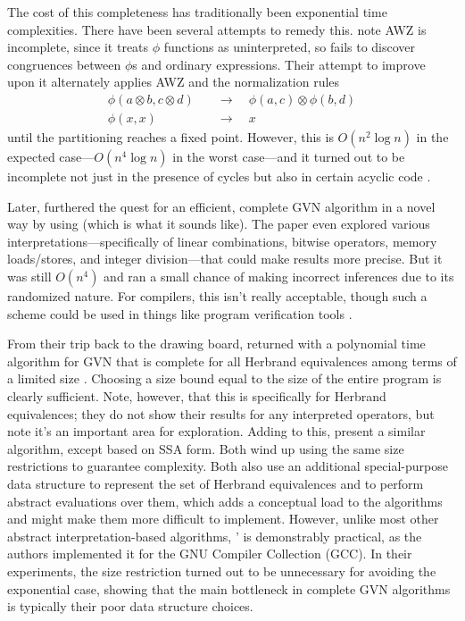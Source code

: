 The cost of this completeness has traditionally been exponential time
complexities.  There have been several attempts to remedy this.
 \autocite*{RKS} note AWZ is incomplete, since it treats $\phi$
functions as uninterpreted, so fails to discover congruences between $\phi$s
and ordinary expressions.  Their attempt to improve upon it alternately applies
AWZ and the normalization rules
\begin{align*}
  \phi(a\otimes b, c\otimes d) &\quad\to\quad \phi(a,c) \otimes \phi(b,d) \\
  \phi(x, x) &\quad\to\quad x
\end{align*}
until the partitioning reaches a fixed point.  However, this is $O(n^2 \log n)$
in the expected case---$O(n^4 \log n)$ in the worst case---and it turned out to
be incomplete not just in the presence of cycles \autocite{RKS} but also in
certain acyclic code \autocite{Gulwani07}.

Later, \citeauthor{Gulwani04} \autocite*{Gulwani04} furthered the quest for an
efficient, complete \gls{GVN} algorithm in a novel way by using
 (which is what it sounds like).  The paper
even explored various interpretations---specifically of linear combinations,
bitwise operators, memory loads/stores, and integer division---that could make
results more precise.  But it was still $O(n^4)$ and ran a small chance of
making incorrect inferences due to its randomized nature.  For compilers, this
isn't really acceptable, though such a scheme could be used in things like
program verification tools \autocite{Nie}.

From their trip back to the drawing board, \citeauthor{Gulwani07} returned with
a polynomial time algorithm for \gls{GVN} that is complete for all Herbrand
equivalences among terms of a limited size \autocite{Gulwani07}.  Choosing a
size bound equal to the size of the entire program is clearly sufficient.
Note, however, that this is specifically for Herbrand equivalences; they do not
show their results for any interpreted operators, but note it's an important
area for exploration.  Adding to this, \citeauthor{Nie} \autocite*{Nie} present
a similar algorithm, except based on \gls{SSA} form.  Both wind up using the
same size restrictions to guarantee complexity.  Both also use an additional
special-purpose data structure to represent the set of Herbrand equivalences
and to perform abstract evaluations over them, which adds a conceptual load to
the algorithms and might make them more difficult to implement.  However,
unlike most other abstract interpretation-based algorithms, \citeauthor{Nie}'
is demonstrably practical, as the authors implemented it for the GNU Compiler
Collection (GCC).  In their experiments, the size restriction turned out to be
unnecessary for avoiding the exponential case, showing that the main bottleneck
in complete \gls{GVN} algorithms is typically their poor data structure
choices.

